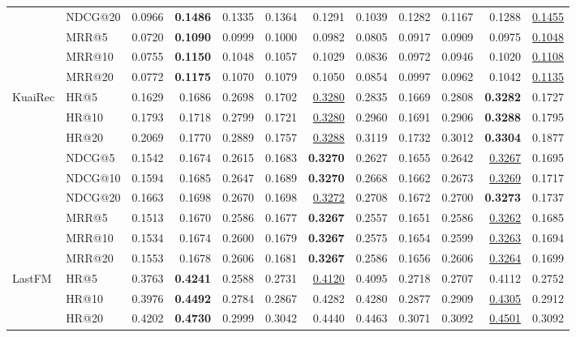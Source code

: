 \begin{tabular}{llrrrrrrrrrr}
 & NDCG@20 & 0.0966 & \textbf{0.1486} & 0.1335 & 0.1364 & 0.1291 & 0.1039 & 0.1282 & 0.1167 & 0.1288 & \underline{0.1455} \\
 & MRR@5 & 0.0720 & \textbf{0.1090} & 0.0999 & 0.1000 & 0.0982 & 0.0805 & 0.0917 & 0.0909 & 0.0975 & \underline{0.1048} \\
 & MRR@10 & 0.0755 & \textbf{0.1150} & 0.1048 & 0.1057 & 0.1029 & 0.0836 & 0.0972 & 0.0946 & 0.1020 & \underline{0.1108} \\
 & MRR@20 & 0.0772 & \textbf{0.1175} & 0.1070 & 0.1079 & 0.1050 & 0.0854 & 0.0997 & 0.0962 & 0.1042 & \underline{0.1135} \\
\hline
KuaiRec & HR@5 & 0.1629 & 0.1686 & 0.2698 & 0.1702 & \underline{0.3280} & 0.2835 & 0.1669 & 0.2808 & \textbf{0.3282} & 0.1727 \\
 & HR@10 & 0.1793 & 0.1718 & 0.2799 & 0.1721 & \underline{0.3280} & 0.2960 & 0.1691 & 0.2906 & \textbf{0.3288} & 0.1795 \\
 & HR@20 & 0.2069 & 0.1770 & 0.2889 & 0.1757 & \underline{0.3288} & 0.3119 & 0.1732 & 0.3012 & \textbf{0.3304} & 0.1877 \\
 & NDCG@5 & 0.1542 & 0.1674 & 0.2615 & 0.1683 & \textbf{0.3270} & 0.2627 & 0.1655 & 0.2642 & \underline{0.3267} & 0.1695 \\
 & NDCG@10 & 0.1594 & 0.1685 & 0.2647 & 0.1689 & \textbf{0.3270} & 0.2668 & 0.1662 & 0.2673 & \underline{0.3269} & 0.1717 \\
 & NDCG@20 & 0.1663 & 0.1698 & 0.2670 & 0.1698 & \underline{0.3272} & 0.2708 & 0.1672 & 0.2700 & \textbf{0.3273} & 0.1737 \\
 & MRR@5 & 0.1513 & 0.1670 & 0.2586 & 0.1677 & \textbf{0.3267} & 0.2557 & 0.1651 & 0.2586 & \underline{0.3262} & 0.1685 \\
 & MRR@10 & 0.1534 & 0.1674 & 0.2600 & 0.1679 & \textbf{0.3267} & 0.2575 & 0.1654 & 0.2599 & \underline{0.3263} & 0.1694 \\
 & MRR@20 & 0.1553 & 0.1678 & 0.2606 & 0.1681 & \textbf{0.3267} & 0.2586 & 0.1656 & 0.2606 & \underline{0.3264} & 0.1699 \\
\hline
LastFM & HR@5 & 0.3763 & \textbf{0.4241} & 0.2588 & 0.2731 & \underline{0.4120} & 0.4095 & 0.2718 & 0.2707 & 0.4112 & 0.2752 \\
 & HR@10 & 0.3976 & \textbf{0.4492} & 0.2784 & 0.2867 & 0.4282 & 0.4280 & 0.2877 & 0.2909 & \underline{0.4305} & 0.2912 \\
 & HR@20 & 0.4202 & \textbf{0.4730} & 0.2999 & 0.3042 & 0.4440 & 0.4463 & 0.3071 & 0.3092 & \underline{0.4501} & 0.3092 \\

\end{tabular}
